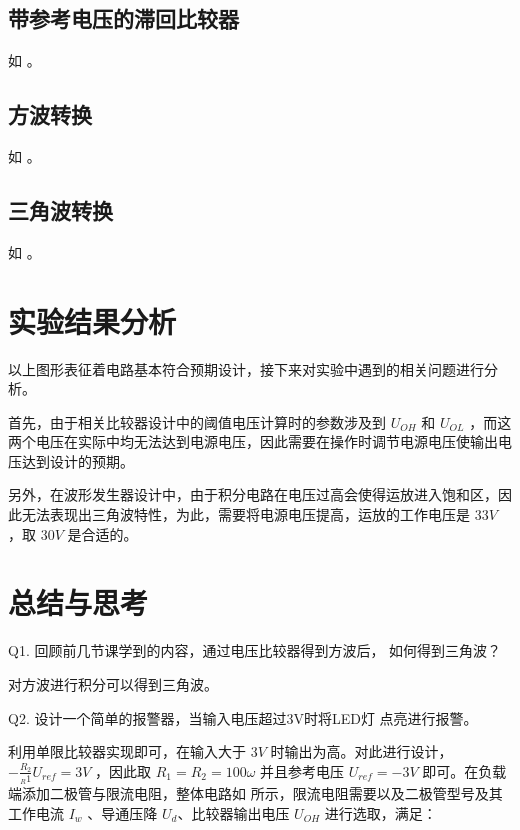 \documentclass[lang=cn,11pt,a4paper,cite=authoryear]{elegantpaper}
\begin{document}
\subsection{带参考电压的滞回比较器}


如  。


\subsection{方波转换}

如  。


\subsection{三角波转换}

如  。


\section{实验结果分析}

以上图形表征着电路基本符合预期设计，接下来对实验中遇到的相关问题进行分析。

首先，由于相关比较器设计中的阈值电压计算时的参数涉及到 \(U_{OH}\) 和 \(U_{OL}\) ，而这两个电压在实际中均无法达到电源电压，因此需要在操作时调节电源电压使输出电压达到设计的预期。

另外，在波形发生器设计中，由于积分电路在电压过高会使得运放进入饱和区，因此无法表现出三角波特性，为此，需要将电源电压提高，运放的工作电压是 \(33 V\) ，取 \(30 V\) 是合适的。


\section{总结与思考}


Q1. 回顾前几节课学到的内容，通过电压比较器得到方波后，
如何得到三角波？

对方波进行积分可以得到三角波。

Q2. 设计一个简单的报警器，当输入电压超过3V时将LED灯
点亮进行报警。

利用单限比较器实现即可，在输入大于 \(3 V\) 时输出为高。对此进行设计，\(- \frac{R_2}{_R1} U_{ref} = 3 V \) ，因此取  \(R_1 = R_2 = 100 \omega \) 并且参考电压 \(U_{ref} = - 3 V\) 即可。在负载端添加二极管与限流电阻，整体电路如  所示，限流电阻需要以及二极管型号及其工作电流 \(I_w\) 、导通压降 \(U_{d}\)、比较器输出电压 \(U_{OH}\)  进行选取，满足：
\end{document}
